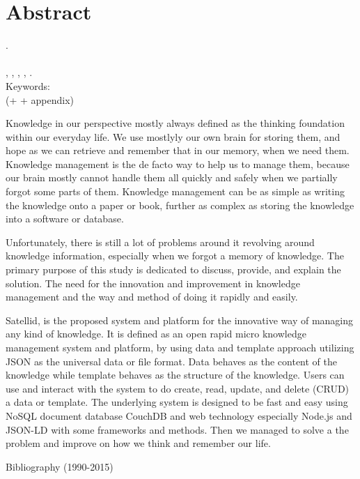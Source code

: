 
\begingroup
\let\clearpage\relax
\let\cleardoublepage\relax

\chapter{Abstract}
\label{chap:abstract}

\myName. \myNPM \\
\myDepTitle \\
\myThesisType, \myDepartmentLong, \myFacultyLong, \myUni, \myYear. \\
Keywords: \myKeywords \\
(+ + appendix)

\vfill

Knowledge in our perspective mostly always defined as the thinking foundation within our everyday life.
We use mostlyly our own brain for storing them, and hope as we can retrieve and remember that in our memory, when we need them.
Knowledge management is the de facto way to help us to manage them, because our brain mostly cannot handle them all quickly and safely when we partially forgot some parts of them.
Knowledge management can be as simple as writing the knowledge onto a paper or book, further as complex as storing the knowledge into a software or database.

Unfortunately, there is still a lot of problems around it revolving around knowledge information, especially when we forgot a memory of knowledge.
The primary purpose of this study is dedicated to discuss, provide, and explain the solution.
The need for the innovation and improvement in knowledge management and the way and method of doing it rapidly and easily.

Satellid, is the proposed system and platform for the innovative way of managing any kind of knowledge.
It is defined as an open rapid micro knowledge management system and platform, by using data and template approach utilizing JSON as the universal data or file format.
Data behaves as the content of the knowledge while template behaves as the structure of the knowledge.
Users can use and interact with the system to do create, read, update, and delete (CRUD) a data or template.
The underlying system is designed to be fast and easy using NoSQL document database CouchDB and web technology especially Node.js and JSON-LD with some frameworks and methods.
Then we managed to solve a the problem and improve on how we think and remember our life.

\vfill

Bibliography (1990-2015)




\endgroup

\vfill

